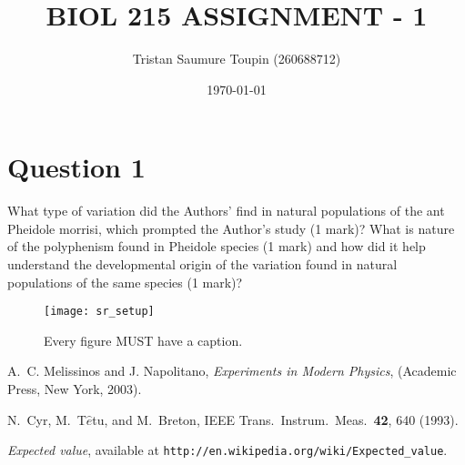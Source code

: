 \documentclass[letterpaper,12pt]{article}
\begin{document}
\title{BIOL 215 ASSIGNMENT - 1}
\author{Tristan Saumure Toupin (260688712)}
\date{\today}
\maketitle

\begin{abstract}

\end{abstract}


\section{Question 1}

What type of variation did the Authors’ find in natural populations of the ant Pheidole morrisi, which prompted the Author’s study (1 mark)? What is nature of the polyphenism found in Pheidole species (1 mark) and how did it help understand the developmental origin of the variation found in natural populations of the same species (1 mark)?



\begin{figure}[ht] 
        \centering \texttt{[image: sr\_setup]}
        \caption{
                \label{fig:samplesetup} %
                Every figure MUST have a caption.
        }
\end{figure}





\begin{thebibliography}{99}

A.~C. Melissinos and J. Napolitano, \textit{Experiments in Modern Physics},
(Academic Press, New York, 2003).

N.\ Cyr, M.\ T$\hat{e}$tu, and M.\ Breton,
IEEE Trans.\ Instrum.\ Meas.\ \textbf{42}, 640 (1993).

 \emph{Expected value},  available at
\texttt{http://en.wikipedia.org/wiki/Expected\_value}.

\end{thebibliography}
\end{document}
